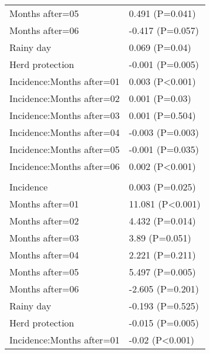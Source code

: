 \documentclass[]{article}
\begin{document}
\begin{longtable}[t]{ll}
\hspace{1em}Months after=05 & 0.491 (P=0.041)\\
\hspace{1em}Months after=06 & -0.417 (P=0.057)\\
\hspace{1em}Rainy day & 0.069 (P=0.04)\\
\hspace{1em}Herd protection & -0.001 (P=0.005)\\
\hspace{1em}Incidence:Months after=01 & 0.003 (P<0.001)\\
\hspace{1em}Incidence:Months after=02 & 0.001 (P=0.03)\\
\hspace{1em}Incidence:Months after=03 & 0.001 (P=0.504)\\
\hspace{1em}Incidence:Months after=04 & -0.003 (P=0.003)\\
\hspace{1em}Incidence:Months after=05 & -0.001 (P=0.035)\\
\hspace{1em}Incidence:Months after=06 & 0.002 (P<0.001)\\
\addlinespace[1.5em]
\multicolumn{2}{l}{\textbf{Temporary not field worker}}\\
\hspace{1em}Incidence & 0.003 (P=0.025)\\
\hspace{1em}Months after=01 & 11.081 (P<0.001)\\
\hspace{1em}Months after=02 & 4.432 (P=0.014)\\
\hspace{1em}Months after=03 & 3.89 (P=0.051)\\
\hspace{1em}Months after=04 & 2.221 (P=0.211)\\
\hspace{1em}Months after=05 & 5.497 (P=0.005)\\
\hspace{1em}Months after=06 & -2.605 (P=0.201)\\
\hspace{1em}Rainy day & -0.193 (P=0.525)\\
\hspace{1em}Herd protection & -0.015 (P=0.005)\\
\hspace{1em}Incidence:Months after=01 & -0.02 (P<0.001)\\

\end{longtable}
\end{document}
